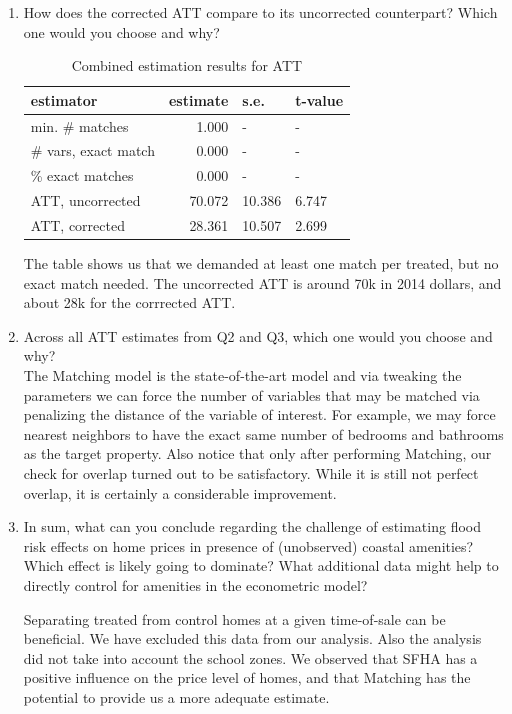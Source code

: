\documentclass[11pt,reqno]{amsart}\usepackage[]{graphicx}\usepackage[]{color}
\newcommand{\ksp}{\vspace{0.1in}}   %
\begin{document}
\begin{enumerate}
\item How does the corrected ATT compare to its uncorrected counterpart? Which one would you choose and why?\\



\begin{table}[!h]
\centering
\caption{Combined estimation results for ATT} 
\begin{tabular}{lrll}
  \hline
estimator & estimate & s.e. & t-value \\ 
  \hline
min. \# matches & 1.000 & - & - \\ 
  \# vars, exact match & 0.000 & - & - \\ 
  \% exact matches & 0.000 & - & - \\ 
  ATT, uncorrected & 70.072 & 10.386 & 6.747 \\ 
  ATT, corrected & 28.361 & 10.507 & 2.699 \\ 
   \hline
\end{tabular}
\end{table}


The table shows us that we demanded at least one match per treated, but no exact match needed. The uncorrected ATT is around 70k in 2014 dollars, and about 28k for the corrrected ATT. 


\item Across all ATT estimates from Q2 and Q3, which one would you choose and why?\\

The Matching model is the state-of-the-art model and via tweaking the parameters we can force the number of variables that may be matched via penalizing the distance of the variable of interest. For example, we may force nearest neighbors to have the exact same number of bedrooms and bathrooms as the target property. Also notice that only after performing Matching, our check for overlap turned out to be satisfactory. While it is still not perfect overlap, it is certainly a considerable improvement. 

\ksp

\item In sum, what can you conclude regarding the challenge of estimating flood risk effects on home prices in presence of (unobserved) coastal amenities? Which effect is likely going to dominate? What additional data might help to directly control for amenities in the econometric model?

\ksp

Separating treated from control homes at a given time-of-sale can be beneficial. We have excluded this data from our analysis. Also the analysis did not take into account the school zones. We observed that SFHA has a positive influence on the price level of homes, and that Matching has the potential to provide us a more adequate estimate. 
\end{enumerate}
\end{document}

